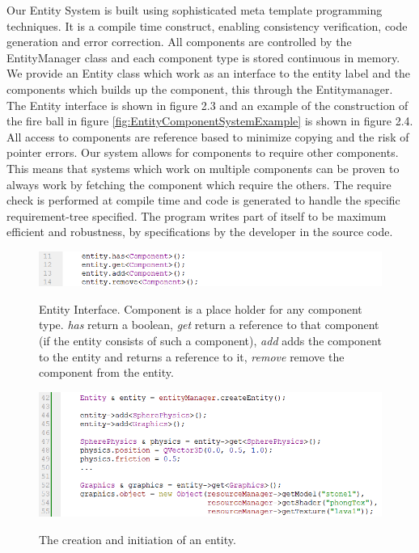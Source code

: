 Our Entity System is built using sophisticated meta template programming techniques. It is a compile time construct, enabling consistency verification, code generation and error correction. All components are controlled by the EntityManager class and each component type is stored continuous in memory. We provide an Entity class which work as an interface to the entity label and the components which builds up the component, this through the Entitymanager. The Entity interface is shown in figure 2.3 and an example of the construction of the fire ball in figure \ref{fig:EntityComponentSystemExample} is shown in figure 2.4. All access to components are reference based to minimize copying and the risk of pointer errors. Our system allows for components to require other components. This means that systems which work on multiple components can be proven to always work by fetching the component which require the others. The require check is performed at compile time and code is generated to handle the specific requirement-tree specified. The program writes part of itself to be maximum efficient and robustness, by specifications by the developer in the source code.
\begin{figure}[H]
  \centering
  \includegraphics[width=0.9\linewidth]{images/entityInterfaceExample.png}
  \label{fig:EntityInterface}
  \caption{Entity Interface. Component is a place holder for any component type. \textit{has} return a boolean, \textit{get} return a reference to that component (if the entity consists of such a component), \textit{add} adds the component to the entity and returns a reference to it, \textit{remove} remove the component from the entity.}
\end{figure}
\begin{figure}[H]
  \centering
  \includegraphics[width=0.9\linewidth]{images/entityCreationExample.png}
  \label{fig:EntitySetupExample}
  \caption{The creation and initiation of an entity.}
\end{figure}
